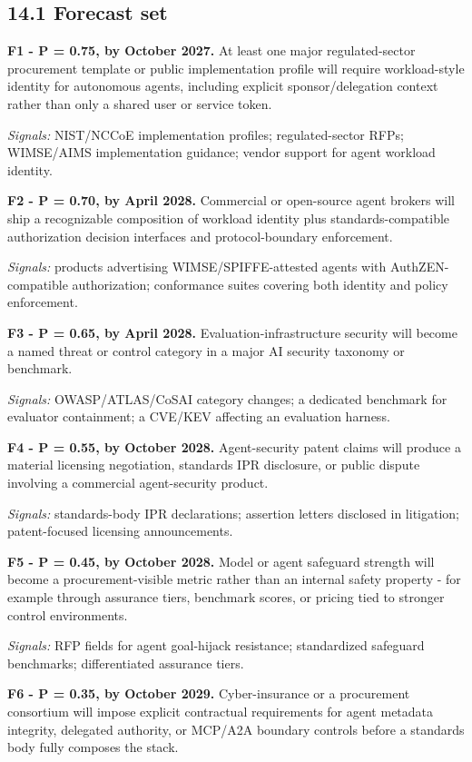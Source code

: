 \documentclass[
  10pt,
  letterpaper,
]{article}
\begin{document}
\subsection{14.1 Forecast set}\label{forecast-set}

\textbf{F1 - P = 0.75, by October 2027.} At least one major
regulated-sector procurement template or public implementation profile
will require workload-style identity for autonomous agents, including
explicit sponsor/delegation context rather than only a shared user or
service token.

\emph{Signals:} NIST/NCCoE implementation profiles; regulated-sector
RFPs; WIMSE/AIMS implementation guidance; vendor support for agent
workload identity.

\textbf{F2 - P = 0.70, by April 2028.} Commercial or open-source agent
brokers will ship a recognizable composition of workload identity plus
standards-compatible authorization decision interfaces and
protocol-boundary enforcement.

\emph{Signals:} products advertising WIMSE/SPIFFE-attested agents with
AuthZEN-compatible authorization; conformance suites covering both
identity and policy enforcement.

\textbf{F3 - P = 0.65, by April 2028.} Evaluation-infrastructure
security will become a named threat or control category in a major AI
security taxonomy or benchmark.

\emph{Signals:} OWASP/ATLAS/CoSAI category changes; a dedicated
benchmark for evaluator containment; a CVE/KEV affecting an evaluation
harness.

\textbf{F4 - P = 0.55, by October 2028.} Agent-security patent claims
will produce a material licensing negotiation, standards IPR disclosure,
or public dispute involving a commercial agent-security product.

\emph{Signals:} standards-body IPR declarations; assertion letters
disclosed in litigation; patent-focused licensing announcements.

\textbf{F5 - P = 0.45, by October 2028.} Model or agent safeguard
strength will become a procurement-visible metric rather than an
internal safety property - for example through assurance tiers,
benchmark scores, or pricing tied to stronger control environments.

\emph{Signals:} RFP fields for agent goal-hijack resistance;
standardized safeguard benchmarks; differentiated assurance tiers.

\textbf{F6 - P = 0.35, by October 2029.} Cyber-insurance or a
procurement consortium will impose explicit contractual requirements for
agent metadata integrity, delegated authority, or MCP/A2A boundary
controls before a standards body fully composes the stack.
\end{document}
